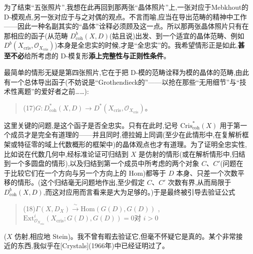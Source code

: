 \noindent 为了结束“五张照片”,我想在此再回到那两张“晶体照片”上,一张对应于Mebkhout的 D-模观点,另一张对应于与之对偶的观点。不言而喻,应当在导出范畴的精神中工作——因此一种名副其实的“晶体”诠释必须顾及这一点。所以那两张晶体照片只有在那相应的函子\dmark{}(从范畴 $D^{b}_{\mathrm{coh}}(X,D)$(姑且说)出发、到一个适宜的晶体范畴、例如 $D^{b}(X_{\mathrm{cris}},\mathcal{O}_{X_{\mathrm{cris}}})$)本身是全忠实的时候,才是“全忠实”的。我希望情形正是如此,\textbf{甚至不必}给所考虑的 D-模复形\textbf{添上完整性与正则性条件}。

\noindent 最简单的情形无疑是第四张照片,它在于把 D-模的范畴诠释为模的晶体的范畴,由此有一个总体导出函子(不妨说是“Grothendieck的”——以抢在那些“无用细节”与“技术性离题”的爱好者之前……):
\begin{quote}
(17)\quad $G : D^{*}_{\mathrm{coh}}(X,D)\longrightarrow D^{*}(X_{\mathrm{cris}},\mathcal{O}_{X_{\mathrm{cris}}})$。
\end{quote}
这里关键的问题,是这个函子是否全忠实。只有在此时,记号 $\mathrm{Cris}^{*}_{\mathrm{coh}}(X)$ 用于第一个成员才是完全有道理的——并且同时,德拉姆上同调(至少在此情形中,在复解析框架或特征零的域上代数概形的框架中)的晶体观点也才有道理。为了证明全忠实性,比如说在代数几何中,经标准论证可归结到 $X$ 是仿射的情形(或在解析情形中,归结到一个多圆盘的情形),以及归结到第一个成员中所考虑的两个对象 $C$、$C'$(问题在于比较它们在一个方向与另一个方向上的 $\mathrm{Hom}$)都等于 $D$ 本身、只差一个次数平移的情形。(这个归结毫无问题地作出,至少假定 $C$、$C'$ 次数有界,从而局限于 $D^{b}_{\mathrm{coh}}(X,D)$,而这对应用而言看来是大为足够的。)于是最终被引导去验证公式
\begin{quote}
(18)\quad $\Gamma(X,D_{X})\xrightarrow{\ \sim\ }\mathrm{Hom}(G(D),G(D))$ ,\quad $\mathrm{Ext}^{i}_{\mathcal{O}_{X_{\mathrm{cris}}}}(X_{\mathrm{cris}};G(D),G(D))=0$\quad 对 $i>0$
\end{quote}
($X$ 仿射,相应地 Stein)。我不曾有暇去验证它,但毫不怀疑它是真的。某个非常接近的东西,我似乎在[Crystals](1966年)中已经证明过了。

